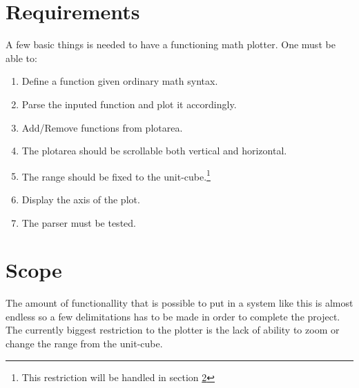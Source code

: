 \documentclass[a4paper,11pt]{kth-mag}
\begin{document}
\section{Requirements}
A few basic things is needed to have a functioning math plotter. One must be able to:
\begin{enumerate}
    \item Define a function given ordinary math syntax.
    \item Parse the inputed function and plot it accordingly.
    \item Add/Remove functions from plotarea.
    \item The plotarea should be scrollable both vertical and horizontal.
    \item The range should be fixed to the unit-cube.\footnote{This restriction will be handled in section \ref{sec:scope}}
    \item Display the axis of the plot.
    \item The parser must be tested.

\end{enumerate}

\section{Scope}
\label{sec:scope}
The amount of functionallity that is possible to put in a system like this is almost endless so a few delimitations has to be made in order to complete the project.
The currently biggest restriction to the plotter is the lack of ability to zoom or change the range from the unit-cube.
\end{document}
